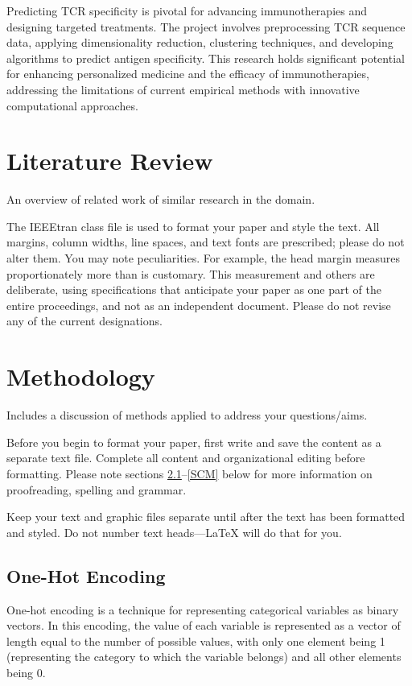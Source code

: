 \documentclass[conference]{IEEEtran}
\begin{document}
	Predicting TCR specificity is pivotal for advancing immunotherapies and designing targeted treatments. The project involves preprocessing TCR sequence data, applying dimensionality reduction, clustering techniques, and developing algorithms to predict antigen specificity. This research holds significant potential for enhancing personalized medicine and the efficacy of immunotherapies, addressing the limitations of current empirical methods with innovative computational approaches.
	
	
	\section{Literature Review}
	{\color{blue}An overview of related work of similar research in the domain.}
	
	The IEEEtran class file is used to format your paper and style the text. All margins, 
	column widths, line spaces, and text fonts are prescribed; please do not 
	alter them. You may note peculiarities. For example, the head margin
	measures proportionately more than is customary. This measurement 
	and others are deliberate, using specifications that anticipate your paper 
	as one part of the entire proceedings, and not as an independent document. 
	Please do not revise any of the current designations.
	
	\section{Methodology}
	{\color{blue}Includes a discussion of methods applied to address your questions/aims.}
	
	Before you begin to format your paper, first write and save the content as a 
	separate text file. Complete all content and organizational editing before 
	formatting. Please note sections \ref{AA}--\ref{SCM} below for more information on 
	proofreading, spelling and grammar.
	
	Keep your text and graphic files separate until after the text has been 
	formatted and styled. Do not number text heads---{\LaTeX} will do that 
	for you.
	
	\subsection{One-Hot Encoding}\label{AA}
	One-hot encoding is a technique for representing categorical variables as binary vectors. In this encoding, the value of each variable is represented as a vector of length equal to the number of possible values, with only one element being 1 (representing the category to which the variable belongs) and all other elements being 0.
	
\end{document}

